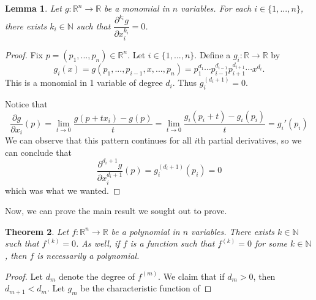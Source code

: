 \documentclass{article}
\theoremstyle{plain} %
\newtheorem{thm}{Theorem}
\numberwithin{thm}{section} %
\newtheorem{lemma}[thm]{Lemma}
\theoremstyle{definition}
\begin{document}
    \begin{lemma}
        Let \(g : \mathbb{R}^n \to \mathbb{R}\) be a monomial in \(n\) variables. For each \(i \in \{1, ..., n\}\), there exists \(k_i \in \mathbb{N}\) such that \(\dfrac{\partial ^{k_i} g}{\partial x_i ^{k_i}} = 0\).
    \end{lemma}
    \begin{proof}
        Fix \(p = (p_1, ..., p_n) \in \mathbb{R}^n\). Let \(i \in \{1, ..., n\}\). Define a \(g_i : \mathbb{R} \to \mathbb{R}\) by
        \[
            g_i(x) = g(p_1, ..., p_{i-1}, x, ..., p_n) = p_1^{d_1}\cdots p_{i-1}^{d_{i-1}} p_{i+1}^{d_{i+1}} \cdots x^{d_i}.
        \]
        This is a monomial in 1 variable of degree \(d_i\). Thus \(g_i^{(d_i + 1)} = 0\).

        Notice that
        \[
            \frac{\partial g}{\partial x_i} (p) = \lim_{t \to 0} \frac{g(p+tx_i) - g(p)}{t} = \lim_{t \to 0} \frac{g_i(p_i + t) - g_i(p_i)}{t} = g_i'(p_i)
        \]
        We can observe that this pattern continues for all \(i\)th partial derivatives, so we can conclude that
        \[
            \dfrac{\partial ^{d_i + 1} g}{\partial x_i ^{d_i + 1}}(p) = g_i^{(d_i + 1)}(p_i) = 0
        \]
        which was what we wanted.
        \smallbreak
    \end{proof}
    
    Now, we can prove the main result we sought out to prove.
    \begin{thm}
        Let \(f : \mathbb{R}^n \to \mathbb{R}\) be a polynomial in \(n\) variables. There exists \(k \in \mathbb{N}\) such that \(f^{(k)} = 0\). As well, if \(f\) is a function such that \(f^{(k)} = 0\) for some \(k \in \mathbb{N}\), then \(f\) is necessarily a polynomial.
    \end{thm}
    \begin{proof}
        Let \(d_m\) denote the degree of \(f^{(m)}\). We claim that if \(d_m > 0\), then \(d_{m+1} < d_m\). Let \(g_m\) be the characteristic function of 
    \end{proof}
\end{document}
